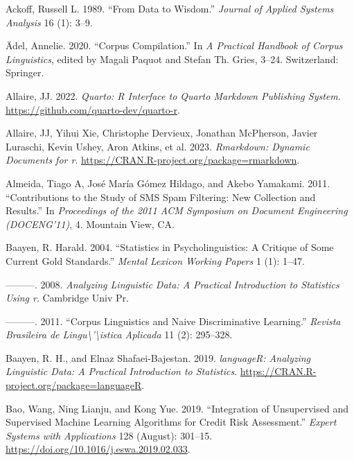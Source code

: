 \documentclass[
  letterpaper,
]{latex/krantz}
\newlength{\cslhangindent}
\newlength{\cslentryspacingunit} %
\newenvironment{CSLReferences}[2] %
 {%
  \setlength{\parindent}{0pt}
  \ifodd #1
  \let\oldpar\par
  \def\par{\hangindent=\cslhangindent\oldpar}
  \fi
  \setlength{\parskip}{#2\cslentryspacingunit}
 }%
 {}
\begin{document}
\hypertarget{refs}{}
\begin{CSLReferences}{1}{0}
\leavevmode{}%
Ackoff, Russell L. 1989. {``From Data to Wisdom.''} \emph{Journal of
Applied Systems Analysis} 16 (1): 3--9.

\leavevmode{}%
Ädel, Annelie. 2020. {``Corpus Compilation.''} In \emph{A Practical
Handbook of Corpus Linguistics}, edited by Magali Paquot and Stefan Th.
Gries, 3--24. Switzerland: Springer.

\leavevmode{}%
Allaire, JJ. 2022. \emph{Quarto: R Interface to Quarto Markdown
Publishing System}. \url{https://github.com/quarto-dev/quarto-r}.

\leavevmode{}%
Allaire, JJ, Yihui Xie, Christophe Dervieux, Jonathan McPherson, Javier
Luraschi, Kevin Ushey, Aron Atkins, et al. 2023. \emph{Rmarkdown:
Dynamic Documents for r}.
\url{https://CRAN.R-project.org/package=rmarkdown}.

\leavevmode{}%
Almeida, Tiago A, José María Gómez Hildago, and Akebo Yamakami. 2011.
{``Contributions to the Study of SMS Spam Filtering: New Collection and
Results.''} In \emph{Proceedings of the 2011 ACM Symposium on Document
Engineering (DOCENG'11)}, 4. Mountain View, CA.

\leavevmode{}%
Baayen, R. Harald. 2004. {``Statistics in Psycholinguistics: A Critique
of Some Current Gold Standards.''} \emph{Mental Lexicon Working Papers}
1 (1): 1--47.

\leavevmode{}%
---------. 2008. \emph{Analyzing Linguistic Data: A Practical
Introduction to Statistics Using r}. Cambridge Univ Pr.

\leavevmode{}%
---------. 2011. {``Corpus Linguistics and Naive Discriminative
Learning.''} \emph{Revista Brasileira de
Lingu\textbackslash'\textbackslash istica Aplicada} 11 (2): 295--328.

\leavevmode{}%
Baayen, R. H., and Elnaz Shafaei-Bajestan. 2019. \emph{languageR:
Analyzing Linguistic Data: A Practical Introduction to Statistics}.
\url{https://CRAN.R-project.org/package=languageR}.

\leavevmode{}%
Bao, Wang, Ning Lianju, and Kong Yue. 2019. {``Integration of
Unsupervised and Supervised Machine Learning Algorithms for Credit Risk
Assessment.''} \emph{Expert Systems with Applications} 128 (August):
301--15. \url{https://doi.org/10.1016/j.eswa.2019.02.033}.


\end{CSLReferences}
\end{document}
